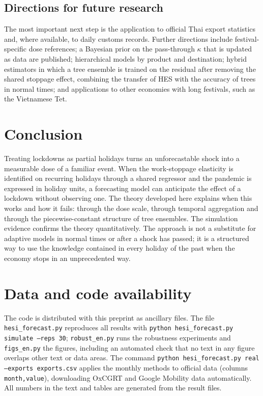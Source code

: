 \documentclass{article}
\theoremstyle{plain}
\theoremstyle{definition}
\theoremstyle{remark}
\begin{document}
\subsection{Directions for future research}
The most important next step is the application to official Thai export statistics and, where available, to daily customs records. Further directions include festival-specific dose references; a Bayesian prior on the pass-through $\kappa$ that is updated as data are published; hierarchical models by product and destination; hybrid estimators in which a tree ensemble is trained on the residual after removing the shared stoppage effect, combining the transfer of HES with the accuracy of trees in normal times; and applications to other economies with long festivals, such as the Vietnamese Tet.

\section{Conclusion}\label{sec:conclusion}
Treating lockdowns as partial holidays turns an unforecastable shock into a measurable dose of a familiar event. When the work-stoppage elasticity is identified on recurring holidays through a shared regressor and the pandemic is expressed in holiday units, a forecasting model can anticipate the effect of a lockdown without observing one. The theory developed here explains when this works and how it fails: through the dose scale, through temporal aggregation and through the piecewise-constant structure of tree ensembles. The simulation evidence confirms the theory quantitatively. The approach is not a substitute for adaptive models in normal times or after a shock has passed; it is a structured way to use the knowledge contained in every holiday of the past when the economy stops in an unprecedented way.

\section*{Data and code availability}
The code is distributed with this preprint as ancillary files. The file \texttt{hesi\_forecast.py} reproduces all results with \texttt{python hesi\_forecast.py simulate --reps 30}; \texttt{robust\_en.py} runs the robustness experiments and \texttt{figs\_en.py} the figures, including an automated check that no text in any figure overlaps other text or data areas. The command \texttt{python hesi\_forecast.py real --exports exports.csv} applies the monthly methods to official data (columns \texttt{month,value}), downloading OxCGRT and Google Mobility data automatically. All numbers in the text and tables are generated from the result files.
\end{document}
